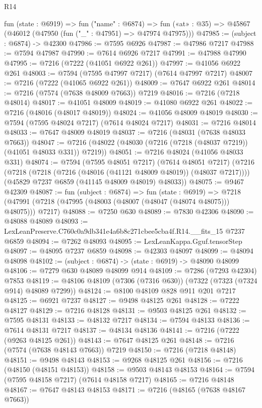 \begin{lexlean}{R14}
\begin{coremodule}
  fun (state : @6919) =>
  fun ("name" : @6874) =>
  fun («at» : @35) => @45867 (@46012 (@47950 (fun ("_" : @47951) => @47974 @47975)))
@47985 := (subject : @6874) -> @42300
@47986 := @7595 @6926
@47987 := @47986 @7217
@47988 := @7594 @47987
@47990 := @7614 @6926 @7217
@47991 := @47988 @47990
@47995 := @7216 (@7222 (@41051 @6922 @261))
@47997 := @41056 @6922 @261
@48003 := @7594 (@7595 @47997 @7217) (@7614 @47997 @7217)
@48007 := @7216 (@7222 (@41065 @6922 @261))
@48009 := @7647 @6922 @261
@48014 := @7216 (@7574 (@7638 @48009 @7663)) @7219
@48016 := @7216 (@7218 @48014)
@48017 := @41051 @48009
@48019 := @41080 @6922 @261
@48022 := @7216 (@48016 (@48017 @48019))
@48024 := @41056 @48009 @48019
@48030 := @7594 (@7595 @48024 @7217) (@7614 @48024 @7217)
@48031 := @7216 @48014
@48033 := @7647 @48009 @48019
@48037 := @7216 (@48031 (@7638 @48033 @7663))
@48047 := @7216 (@48022 (@48030 (@7216 (@7218 (@48037 @7219)) (@41051 @48033 @331)) @7219))
@48051 := @7216 @48024 (@41056 @48033 @331)
@48074 := @7594
    (@7595 @48051 @7217)
    (@7614 @48051 @7217)
    (@7216
      (@7218 (@7218 (@7216 (@48016 (@41121 @48009 @48019)) (@48037 @7217))))
      (@45829 @7237 @6859 (@41145 @48009 @48019) @48033))
@48075 := @9467 @42309
@48087 := fun (subject : @6874) =>
  fun (state : @6919) =>
  @7218 (@47991 (@7218 (@47995 (@48003 (@48007 (@48047 (@48074 @48075))) @48075))) @7217)
@48088 := @7250 @630
@48089 := @7830 @42306
@48090 := @48088 @48089
@48093 := LexLeanPreserve.C760c0a9db341e4a6b8c271cbee5cba4f.R14.__fits_15 @7237 @6859
@48094 := @7262 @48093
@48095 := LexLeanKappa.Gguf.tensorStep
@48097 := @48095 @7237 @6859
@48098 := @42303 @48097
@48099 := @48094 @48098
@48102 := (subject : @6874) -> (state : @6919) -> @48090 @48099
@48106 := @7279 @630 @48089 @48099 @914
@48109 := @7286 (@7293 @42304) @7853
@48119 := @48106 @48109 (@7306 (@7316 @630)) (@7322 (@7323 (@7324 @914) @48089 @7299))
@48124 := @8100 @48109 @828 @911 @201 @7217
@48125 := @6921 @7237
@48127 := @9498 @48125 @261
@48128 := @7222 @48127
@48129 := @7216 @48128
@48131 := @9503 @48125 @261
@48132 := @7595 @48131
@48133 := @48132 @7217
@48134 := @7594 @48133
@48136 := @7614 @48131 @7217
@48137 := @48134 @48136
@48141 := @7216 (@7222 (@9263 @48125 @261))
@48143 := @7647 @48125 @261
@48148 := @7216 (@7574 (@7638 @48143 @7663)) @7219
@48150 := @7216 (@7218 @48148)
@48151 := @9498 @48143
@48153 := @9268 @48125 @261
@48156 := @7216 (@48150 (@48151 @48153))
@48158 := @9503 @48143 @48153
@48164 := @7594 (@7595 @48158 @7217) (@7614 @48158 @7217)
@48165 := @7216 @48148
@48167 := @7647 @48143 @48153
@48171 := @7216 (@48165 (@7638 @48167 @7663))

\end{coremodule}
\end{lexlean}
